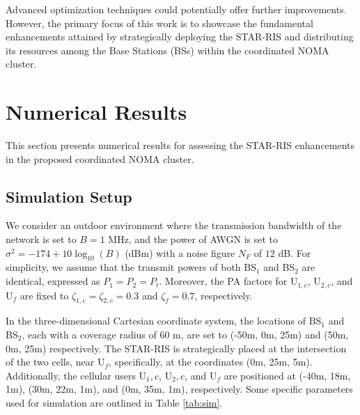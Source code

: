 \documentclass[conference]{IEEEtran}
\begin{document}
Advanced optimization techniques could potentially offer further improvements. However, the primary focus of this work is to showcase the fundamental enhancements attained by strategically deploying the STAR-RIS and distributing its resources among the Base Stations (BSs) within the coordinated NOMA cluster.

\section{Numerical Results}
This section presents numerical results for assessing the STAR-RIS enhancements in the proposed coordinated NOMA cluster.
\subsection{Simulation Setup}
We consider an outdoor environment where the transmission bandwidth of the network is set to $B = 1$ MHz, and the power of AWGN is set to $\sigma^2 = -174 + 10\log_{10}\left(B\right)$ (dBm) with a noise figure $N_F$ of $12$ dB. For simplicity, we assume that the transmit powers of both BS$_1$ and BS$_2$ are identical, expressed as $P_1 = P_2 = P_t$. Moreover, the PA factors for U$_{1,c}$, U$_{2,c}$, and U$_f$ are fixed to $\zeta_{1,c}=\zeta_{2,c}=0.3$ and $\zeta_f=0.7$, respectively.

In the three-dimensional Cartesian coordinate system, the locations of BS$_1$ and BS$_2$, each with a coverage radius of 60 m, are set to (-50m, 0m, 25m) and (50m, 0m, 25m) respectively. The STAR-RIS is strategically placed at the intersection of the two cells, near U$_f$, specifically, at the coordinates (0m, 25m, 5m). Additionally, the cellular users U$_1,c$, U$_2,c$, and U$_f$ are positioned at (-40m, 18m, 1m), (30m, 22m, 1m), and (0m, 35m, 1m), respectively. Some specific parameters used for simulation are outlined in Table \ref{tab:sim}.
\end{document}
